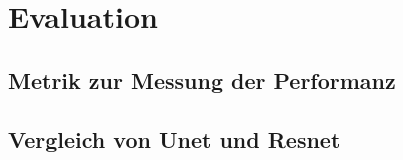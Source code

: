 \chapter{Evaluation}
\section{Metrik zur Messung der Performanz}
\section{Vergleich von Unet und Resnet}